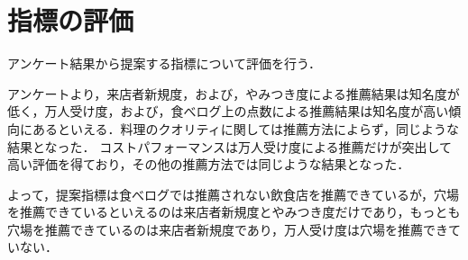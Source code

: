 \section{指標の評価}
アンケート結果から提案する指標について評価を行う．\par
アンケートより，来店者新規度，および，やみつき度による推薦結果は知名度が低く，万人受け度，および，食べログ上の点数による推薦結果は知名度が高い傾向にあるといえる．料理のクオリティに関しては推薦方法によらず，同じような結果となった．
コストパフォーマンスは万人受け度による推薦だけが突出して高い評価を得ており，その他の推薦方法では同じような結果となった．%
\par
よって，提案指標は食べログでは推薦されない飲食店を推薦できているが，穴場を推薦できているといえるのは来店者新規度とやみつき度だけであり，もっとも穴場を推薦できているのは来店者新規度であり，万人受け度は穴場を推薦できていない．

